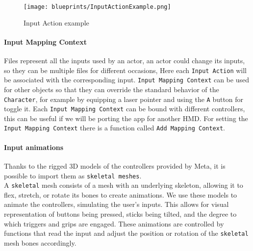 \begin{figure}[ht]
    \centering
    \texttt{[image: blueprints/InputActionExample.png]}
    \caption{Input Action example}
    \label{fig:InputAction}
\end{figure}

\paragraph{Input Mapping Context}
Files represent all the inputs used by an actor, an actor could change its inputs, so they can be multiple files for different occasions,
Here each \texttt{Input Action} will be associated with the corresponding input.
\texttt{Input Mapping Context} can be used for other objects so that they can override the standard behavior of the \texttt{Character}, for example by equipping a laser pointer and using the \texttt{A} button for toggle it.
Each \texttt{Input Mapping Context} can be bound with different controllers, this can be useful if we will be porting the app for another \ac{HMD}.
For setting the \texttt{Input Mapping Context} there is a function called \texttt{Add Mapping Context}.

\paragraph{Input animations}
Thanks to the rigged 3D models of the controllers provided by Meta, it is possible to import them as \texttt{skeletal meshes}.\\
A \texttt{skeletal} mesh consists of a mesh with an underlying skeleton, allowing it to flex, stretch, or rotate its bones to create animations.
We use these models to animate the controllers, simulating the user's inputs. This allows for visual representation of buttons being pressed, sticks being tilted, and the degree to which triggers and grips are engaged.
These animations are controlled by functions that read the input and adjust the position or rotation of the \texttt{skeletal} mesh bones accordingly.


